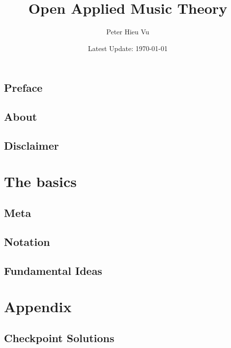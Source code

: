 \documentclass[12pt]{book}
\title{Open Applied Music Theory}
\author{Peter Hieu Vu}
\date{Latest Update: \today}
\renewcommand{\chaptermark}[1]{ \markboth{#1}{} }
\renewcommand{\sectionmark}[1]{ \markright{#1}{} }
\newcommand\onlyinsubfile[1]{#1}
\newcommand\notinsubfile[1]{}
\begin{document}
\renewcommand{\onlyinsubfile}[1]{}
\renewcommand{\notinsubfile}[1]{#1}

    \maketitle
    
    \frontmatter
    \chapter{Preface}\label{preface}
    
    
    \chapter{About}\label{about}
    
    
    \tableofcontents
    
    \chapter{Disclaimer}\label{disclaimer}
    
    
    \mainmatter
    \setcounter{chapter}{-1}
    \renewcommand{\chaptermark}[1]{ \markboth{Ch.\thechapter\enspace #1}{} }
    \renewcommand{\sectionmark}[1]{ \markright{\thesection\enspace #1}{} }
    
    \part{The basics}

        \chapter{Meta}\label{ch0}
            

        \chapter{Notation}\label{ch1}
            
            
        \chapter{Fundamental Ideas}\label{ch2}
            
    
    \part{Appendix}


        \chapter*{Checkpoint Solutions}\label{checkpoints}
            
\end{document}
